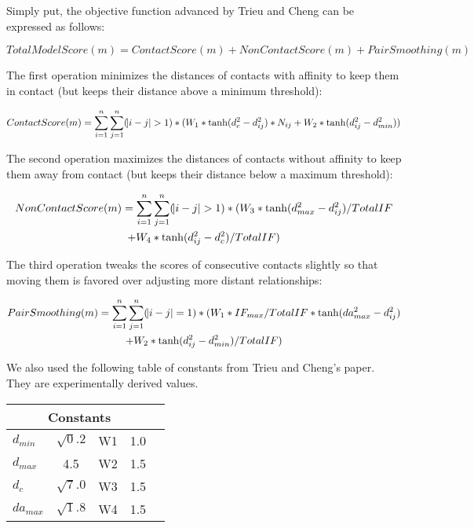 \documentclass{article}
\begin{document}
Simply put, the objective function advanced by Trieu and Cheng can be expressed as follows:

\begin{equation}
      TotalModelScore(m) = ContactScore(m) + NonContactScore(m) + PairSmoothing(m)
\end{equation}

The first operation minimizes the distances of contacts with affinity to keep them in contact (but keeps their distance above a minimum threshold):

\begin{equation}
      ContactScore(m) = \sum_{i=1}^{n} \sum_{j=1}^{n} (\abs{i-j}>1) * (W_1 * \tanh(d_c^2-d_{ij}^2) * N_{ij} + W_2 * \tanh(d_{ij}^2-d_{min}^2))
\end{equation}

The second operation maximizes the distances of contacts without affinity to keep them away from contact (but keeps their distance below a maximum threshold):

\begin{multline}
      NonContactScore(m) = \sum_{i=1}^{n} \sum_{j=1}^{n} (\abs{i-j}>1) * (W_3 * \tanh(d_{max}^2-d_{ij}^2) / TotalIF \\+ W_4 * \tanh(d_{ij}^2-d_{c}^2) / TotalIF)
\end{multline}

The third operation tweaks the scores of consecutive contacts slightly so that moving them is favored over adjusting more distant relationships:

\begin{multline}
      PairSmoothing(m) = \sum_{i=1}^{n} \sum_{j=1}^{n} (\abs{i-j}=1) * (W_1 * IF_{max} / TotalIF * \tanh(da_{max}^2-d_{ij}^2) \\+ W_2 * \tanh(d_{ij}^2-d_{min}^2) / TotalIF)
\end{multline}

We also used the following table of constants from Trieu and Cheng's paper.  They are experimentally derived values.

\begin{center}
\begin{tabular}{|l|c|c|c|r|}
\multicolumn{4}{c}{Constants} \\
    \hline
    $d_{min}$ & $\sqrt 0.2$ & W1 & 1.0           \\ \hline
    $d_{max}$ & 4.5  & W2 & 1.5      \\ \hline
    $d_{c}$ & $\sqrt 7.0$  & W3 & 1.5            \\ \hline
    $da_{max}$ & $\sqrt 1.8$  & W4 & 1.5     \\ \hline
    \end{tabular}
\end{center}
\end{document}
